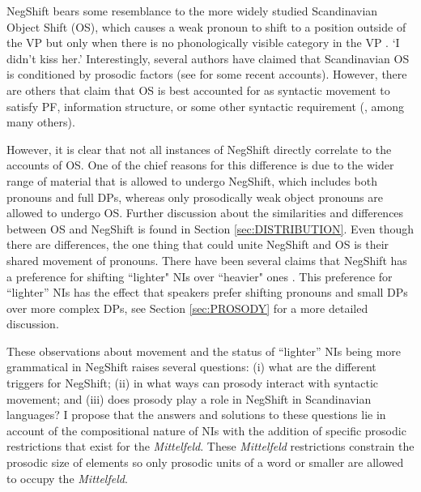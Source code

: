 \documentclass[12pt, letterpaper]{article}
\begin{document}
NegShift bears some resemblance to the more widely studied Scandinavian Object Shift (OS), which causes a weak pronoun to shift to a position outside of the VP but only when there is no phonologically visible category in  the VP \citep{holmbergWordOrderSyntactic1986,holmbergRemarksHolmbergGeneralization1999}.
	 
	\glt `I didn't kiss her.'   
	\z  
Interestingly, several authors have claimed that Scandinavian OS is conditioned by prosodic factors (see \cite{erteschik-shirSoundPatternsSyntax2005,erteschik-shirScandinavianObjectShift2017,erteschik-shirVariationMainlandScandinavian2020,brinkerhoffMATCHINGPhrasesNorwegian2021} for some recent accounts). However, there are others that claim that OS is best accounted for as syntactic movement to satisfy PF, information structure, or some other syntactic requirement (\cite{holmbergRemarksHolmbergGeneralization1999,thrainssonObjectShiftScrambling2001,foxCyclicLinearizationSyntactic2005,bentzenObjectShiftSpoken2013}, among many others). 

However, it is clear that not all instances of NegShift directly correlate to the accounts of OS. One of the chief reasons for this difference is due to the wider range of material that is allowed to undergo NegShift, which includes both pronouns and full DPs, whereas only prosodically weak object pronouns are allowed to undergo OS. Further discussion about the similarities and differences between OS and NegShift is found in Section \ref{sec:DISTRIBUTION}. Even though there are differences, the one thing that could unite NegShift and OS is their shared movement of pronouns. There have been several claims that NegShift has a preference for shifting ``lighter" NIs over ``heavier" ones \citep{christensenInterfacesNegationSyntax2005,penkaNegativeIndefinites2011}. This preference for ``lighter'' NIs has the effect that speakers prefer shifting pronouns and small DPs over more complex DPs, see Section \ref{sec:PROSODY} for a more detailed discussion. 

These observations about movement and the status of ``lighter'' NIs being more grammatical in NegShift raises several questions: (i) what are the different triggers for NegShift; (ii) in what ways can prosody interact with syntactic movement; and (iii) does prosody play a role in NegShift in Scandinavian languages? I propose that the answers and solutions to these questions lie in  account of the compositional nature of NIs with the addition of specific prosodic restrictions that exist for the \emph{Mittelfeld}. These \emph{Mittelfeld} restrictions constrain the prosodic size of elements so only prosodic units of a word or smaller are allowed to occupy the \emph{Mittelfeld}. 
\end{document}
